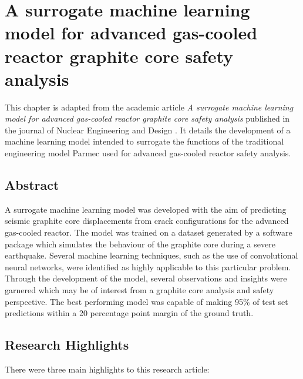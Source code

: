 \chapter[Surrogate ML Model Development]{A surrogate machine learning model for advanced gas-cooled reactor graphite core safety analysis}


\label{cha:surrogate}


This chapter is adapted from the academic article \textit{A surrogate machine learning model for advanced gas-cooled reactor graphite core safety analysis} published in the journal of Nuclear Engineering and Design \cite{jones2022surrogate}. It details the development of a machine learning model intended to surrogate the functions of the traditional engineering model Parmec \cite{wiki:xxx} used for advanced gas-cooled reactor safety analysis.

\section{Abstract}

A surrogate machine learning model was developed with the aim of predicting seismic graphite core displacements from crack configurations for the advanced gas-cooled reactor. The model was trained on a dataset
generated by a software package which simulates the behaviour of the graphite core during a severe earthquake.
Several machine learning techniques, such as the use of convolutional neural networks, were identified as highly
applicable to this particular problem. Through the development of the model, several observations and insights
were garnered which may be of interest from a graphite core analysis and safety perspective. The best performing
model was capable of making 95\% of test set predictions within a 20 percentage point margin of the ground
truth.

\section{Research Highlights}

There were three main highlights to this research article:

